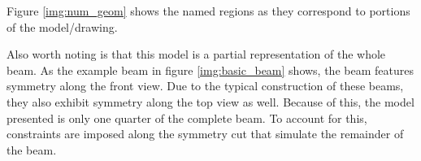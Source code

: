 Figure \ref{img:num_geom} shows the named regions as they correspond to portions of the model/drawing. 

Also worth noting is that this model is a partial representation of the whole beam. As the example beam in figure \ref{img:basic_beam} shows, the beam features symmetry along the front view. Due to the typical construction of these beams, they also exhibit symmetry along the top view as well. Because of this, the model presented is only one quarter of the complete beam. To account for this, constraints are imposed along the symmetry cut that simulate the remainder of the beam. 

